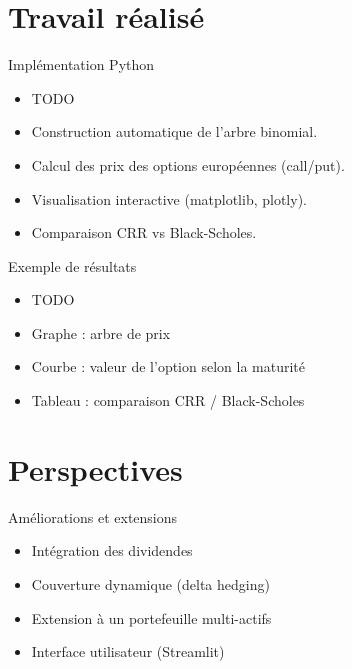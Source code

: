 \documentclass[11pt]{beamer}
\begin{document}
\section{Travail réalisé}

\begin{frame}{Implémentation Python}
\begin{itemize}
    \item TODO
    \item Construction automatique de l’arbre binomial.
    \item Calcul des prix des options européennes (call/put).
    \item Visualisation interactive (matplotlib, plotly).
    \item Comparaison CRR vs Black-Scholes.
\end{itemize}
\end{frame}

\begin{frame}{Exemple de résultats}
\begin{itemize}
    \item TODO
    \item Graphe : arbre de prix
    \item Courbe : valeur de l'option selon la maturité
    \item Tableau : comparaison CRR / Black-Scholes
\end{itemize}

\end{frame}

\section{Perspectives}

\begin{frame}{Améliorations et extensions}
\begin{itemize}
    \item Intégration des dividendes
    \item Couverture dynamique (delta hedging)
    \item Extension à un portefeuille multi-actifs
    \item Interface utilisateur (Streamlit)
\end{itemize}
\end{frame}
\end{document}
